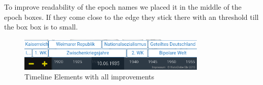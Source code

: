 To improve readability of the epoch names we placed it in the middle of the epoch boxes. If they come close to the edge they stick there with an threshold till the box box is to small.

\begin{figure}[H]
	\centering
	\includegraphics[width=0.8\textwidth]{graphics/timeline_elements2.png}
	\caption{Timeline Elements with all improvements}
	\label{fig:Timeline_Elements2}
\end{figure}

